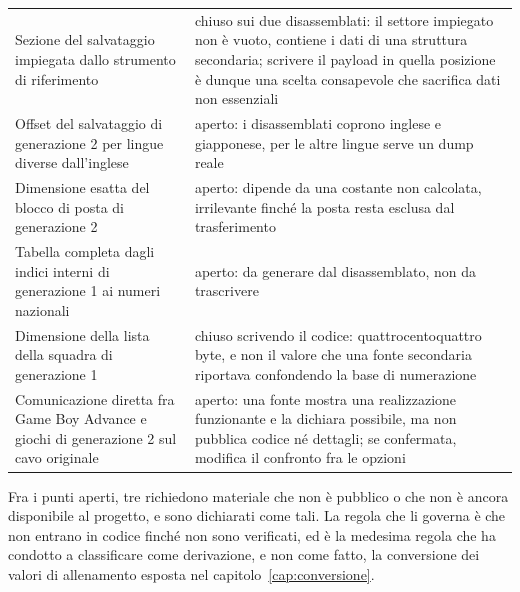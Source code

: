 \begin{longtable}{@{}p{5.2cm}p{9.2cm}@{}}
Sezione del salvataggio impiegata dallo strumento di riferimento & chiuso sui due disassemblati: il settore impiegato non è vuoto, contiene i dati di una struttura secondaria; scrivere il payload in quella posizione è dunque una scelta consapevole che sacrifica dati non essenziali \\
Offset del salvataggio di generazione 2 per lingue diverse dall'inglese & aperto: i disassemblati coprono inglese e giapponese, per le altre lingue serve un dump reale \\
Dimensione esatta del blocco di posta di generazione 2 & aperto: dipende da una costante non calcolata, irrilevante finché la posta resta esclusa dal trasferimento \\
Tabella completa dagli indici interni di generazione 1 ai numeri nazionali & aperto: da generare dal disassemblato, non da trascrivere \\
Dimensione della lista della squadra di generazione 1 & chiuso scrivendo il codice: quattrocentoquattro byte, e non il valore che una fonte secondaria riportava confondendo la base di numerazione \\
Comunicazione diretta fra Game Boy Advance e giochi di generazione 2 sul cavo originale & aperto: una fonte mostra una realizzazione funzionante e la dichiara possibile, ma non pubblica codice né dettagli; se confermata, modifica il confronto fra le opzioni \\
\bottomrule
\end{longtable}

Fra i punti aperti, tre richiedono materiale che non è pubblico o che non è ancora disponibile al progetto, e sono dichiarati come tali. La regola che li governa è che non entrano in codice finché non sono verificati, ed è la medesima regola che ha condotto a classificare come derivazione, e non come fatto, la conversione dei valori di allenamento esposta nel capitolo~\ref{cap:conversione}.
